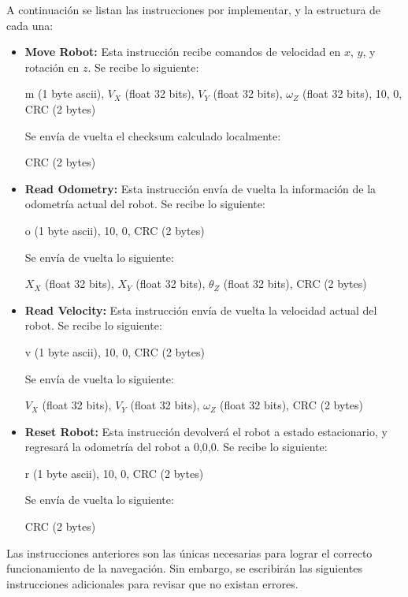 A continuación se listan las instrucciones por implementar, y la estructura de cada una:

\begin{itemize}
\item \textbf{Move Robot:} Esta instrucción recibe comandos de velocidad en $x$, $y$, y rotación en $z$. Se recibe lo siguiente:

m (1 byte ascii), $V_X$ (float 32 bits), $V_Y$ (float 32 bits), $\omega_Z$ (float 32 bits), 10, 0, CRC (2 bytes)

Se envía de vuelta el checksum calculado localmente:

CRC (2 bytes)

\item \textbf{Read Odometry:} Esta instrucción envía de vuelta la información de la odometría actual del robot. Se recibe lo siguiente:

o (1 byte ascii), 10, 0, CRC (2 bytes)

Se envía de vuelta lo siguiente:

$X_X$ (float 32 bits), $X_Y$ (float 32 bits), $\theta_Z$ (float 32 bits), CRC (2 bytes)

\item \textbf{Read Velocity:} Esta instrucción envía de vuelta la velocidad actual del robot. Se recibe lo siguiente:

v (1 byte ascii), 10, 0, CRC (2 bytes)

Se envía de vuelta lo siguiente:

$V_X$ (float 32 bits), $V_Y$ (float 32 bits), $\omega_Z$ (float 32 bits), CRC (2 bytes)

\item \textbf{Reset Robot:} Esta instrucción devolverá el robot a estado estacionario, y regresará la odometría del robot a 0,0,0. Se recibe lo siguiente:

r (1 byte ascii), 10, 0, CRC (2 bytes)

Se envía de vuelta lo siguiente:

CRC (2 bytes)
\end{itemize}


Las instrucciones anteriores son las únicas necesarias para lograr el correcto funcionamiento de la navegación. Sin embargo, se escribirán las siguientes instrucciones adicionales para revisar que no existan errores.

